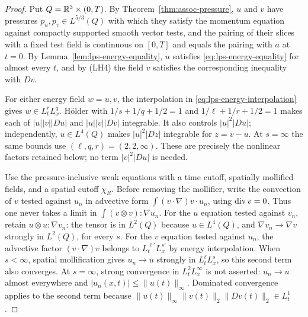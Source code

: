 \documentclass[11pt,letterpaper]{article}
\numberwithin{equation}{section}
\theoremstyle{plain}
\theoremstyle{definition}
\theoremstyle{remark}
\begin{document}
\begin{proof}
Put $Q=\mathbb{R}^3\times(0,T)$. By Theorem~\ref{thm:assoc-pressure}, $u$ and $v$
have pressures $p_u,p_v\in L^{5/3}(Q)$ with which they satisfy the
momentum equation against compactly supported smooth vector tests, and the
pairing of their slices with a fixed test field is continuous on $[0,T]$ and
equals the pairing with $a$ at $t=0$. By
Lemma~\ref{lem:lps-energy-equality}, $u$ satisfies
\eqref{eq:lps-energy-equality} for almost every $t$, and by (LH4) the field
$v$ satisfies the corresponding inequality with $Dv$.

For either energy field $w=u,v$, the interpolation in
\eqref{eq:lps-energy-interpolation} gives $w\in L^r_tL^q_x$.
H\"older with $1/s+1/q+1/2=1$ and
$1/\ell+1/r+1/2=1$ makes each of
$|u||v||Du|$ and $|u||v||Dv|$ integrable.
It also controls $|u|^2|Du|$; independently,
$u\in L^4(Q)$ makes $|u|^2|Dz|$ integrable for $z=v-u$.
At $s=\infty$ the same bounds use $(\ell,q,r)=(2,2,\infty)$.
These are precisely the nonlinear factors retained below; no term
$|v|^2|Du|$ is needed.

Use the pressure-inclusive weak equations with a time cutoff, spatially
mollified fields, and a spatial cutoff $\chi_R$. Before removing the
mollifier, write the convection of $v$ tested against $u_n$ in
advective form $\int(v\cdot\nabla)v\cdot u_n$, using
$\operatorname{div} v=0$. Thus one never takes a limit in
$\int(v\otimes v):\nabla u_n$. For the $u$ equation tested against
$v_n$, retain $u\otimes u:\nabla v_n$: the tensor is in $L^2(Q)$
because $u\in L^4(Q)$, and $\nabla v_n\to\nabla v$ strongly in
$L^2(Q)$, for every $s$. For the $v$ equation tested against
$u_n$, the advective factor $(v\cdot\nabla)v$ belongs to
$L^{\ell'}_tL^{s'}_x$ by energy interpolation. When $s<\infty$,
spatial mollification gives $u_n\to u$ strongly in
$L^\ell_tL^s_x$, so this second term also converges. At
$s=\infty$, strong convergence in $L^2_tL^\infty_x$ is not
asserted: $u_n\to u$ almost everywhere and
$|u_n(x,t)|\le\|u(t)\|_\infty$. Dominated convergence applies
to the second term because
$\|u(t)\|_\infty\|v(t)\|_2\|Dv(t)\|_2\in L^1_t$.


\end{proof}
\end{document}
